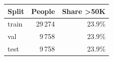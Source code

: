 \begin{tabular}{lrr}
\toprule
Split & People & Share >50K \\
\midrule
train & 29\,274 & 23.9\% \\
val & 9\,758 & 23.9\% \\
test & 9\,758 & 23.9\% \\
\bottomrule
\end{tabular}
